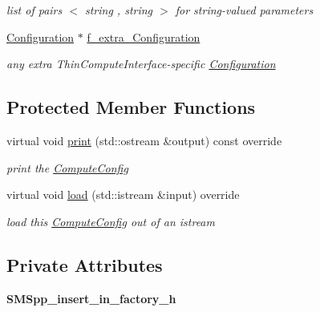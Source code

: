 \begin{DoxyCompactItemize}
\begin{DoxyCompactList}\small\item\em list of pairs $<$ string , string $>$ for string-\/valued parameters \end{DoxyCompactList}\item 
\mbox{\label{class_s_m_spp__di__unipi__it_1_1_compute_config_a7d26c4062ec83c8aafe8363a2be49f7c}} 
\mbox{\hyperlink{class_s_m_spp__di__unipi__it_1_1_configuration}{Configuration}} $\ast$ \mbox{\hyperlink{class_s_m_spp__di__unipi__it_1_1_compute_config_a7d26c4062ec83c8aafe8363a2be49f7c}{f\+\_\+extra\+\_\+\+Configuration}}
\begin{DoxyCompactList}\small\item\em any extra Thin\+Compute\+Interface-\/specific \mbox{\hyperlink{class_s_m_spp__di__unipi__it_1_1_configuration}{Configuration}} \end{DoxyCompactList}\end{DoxyCompactItemize}
\subsection*{Protected Member Functions}
\begin{DoxyCompactItemize}
\item 
\mbox{\label{class_s_m_spp__di__unipi__it_1_1_compute_config_a59a9fcbf8f9f86d348344b2073644b0e}} 
virtual void \mbox{\hyperlink{class_s_m_spp__di__unipi__it_1_1_compute_config_a59a9fcbf8f9f86d348344b2073644b0e}{print}} (std\+::ostream \&output) const override
\begin{DoxyCompactList}\small\item\em print the \mbox{\hyperlink{class_s_m_spp__di__unipi__it_1_1_compute_config}{Compute\+Config}} \end{DoxyCompactList}\item 
virtual void \mbox{\hyperlink{class_s_m_spp__di__unipi__it_1_1_compute_config_a019850055afe817b816bae5699f461d3}{load}} (std\+::istream \&input) override
\begin{DoxyCompactList}\small\item\em load this \mbox{\hyperlink{class_s_m_spp__di__unipi__it_1_1_compute_config}{Compute\+Config}} out of an istream \end{DoxyCompactList}\end{DoxyCompactItemize}
\subsection*{Private Attributes}
\begin{DoxyCompactItemize}
\item 
\mbox{\label{class_s_m_spp__di__unipi__it_1_1_compute_config_a5618a1c2a09ff7cd62e4de9df7956672}} 
{\bfseries S\+M\+Spp\+\_\+insert\+\_\+in\+\_\+factory\+\_\+h}
\end{DoxyCompactItemize}
